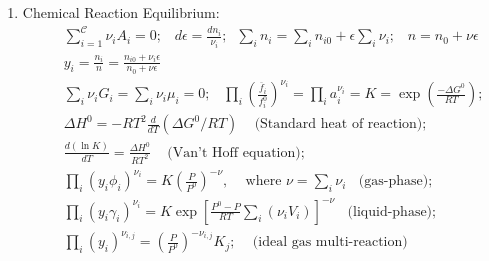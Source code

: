 \documentclass[12pts,a4paper,amsmath,amssymb,floatfix]{article}%
\newcommand{\frc}{\displaystyle\frac}
\newcommand{\summation}[3][error]{\sum\limits_{#2}^{#3}#1}
\begin{document}
\begin{enumerate}[1)]
\item Chemical Reaction Equilibrium:
  \begin{eqnarray}
    && \summation[\nu_{i}A_{i}]{i=1}{\mathcal{C}}=0;\;\;\;d\epsilon=\frc{dn_{i}}{\nu_{i}};\;\;\summation[n_{i}]{i}{} = \summation[n_{i0}]{i}{}+\epsilon\summation[\nu_{i}]{i}{};\;\;\; n = n_{0} +\nu\epsilon \nonumber \\
    &&  y_{i} = \frc{n_{i}}{n} = \frc{n_{i0}+\nu_{i}\epsilon}{n_{0}+\nu\epsilon} \nonumber \\
    && \summation[\nu_{i}G_{i}]{i}{} = \summation[\nu_{i}\mu_{i}]{i}{}=0;\;\;\; \prod\limits_{i}\left(\frc{\overline{f}_{i}}{f_{i}^{0}}\right)^{\nu_{i}} = \prod\limits_{i}a_{i}^{\nu_{i}} = K =\exp\left(\frc{-\Delta G^{0}}{RT}\right); \nonumber \\
    && \Delta H^{0} = -RT^{2}\frc{d}{dT}\left(\Delta G^{0}/RT\right)\;\;\;\text{ (Standard heat of reaction)};\nonumber \\
    && \frc{d\left(\ln{K}\right)}{dT} =\frc{\Delta H^{0}}{RT^{2}}\;\;\;\text{ (Van't Hoff equation)};\nonumber \\
    && \prod\limits_{i}\left(y_{i}\phi_{i}\right)^{\nu_{i}} =K \left(\frc{P}{P^{0}}\right)^{-\nu},\;\;\; \text{ where } \nu=\sum\limits_{i}\nu_{i}\;\;\text{ (gas-phase)}; \nonumber\\
    && \prod\limits_{i}\left(y_{i}\gamma_{i}\right)^{\nu_{i}} = K\exp\left[\frc{P^{0}-P}{RT}\sum\limits_{i}\left(\nu_{i}V_{i}\right)\right]^{-\nu}\;\;\text{ (liquid-phase)};\nonumber\\
    && \prod_{i}\left(y_{i}\right)^{\nu_{i,j}} = \left(\frc{P}{P^{0}}\right)^{-\nu_{i,j}}K_{j};\;\;\;\text{ (ideal gas multi-reaction)} \nonumber
  \end{eqnarray}
  
\end{enumerate}
\end{document}
